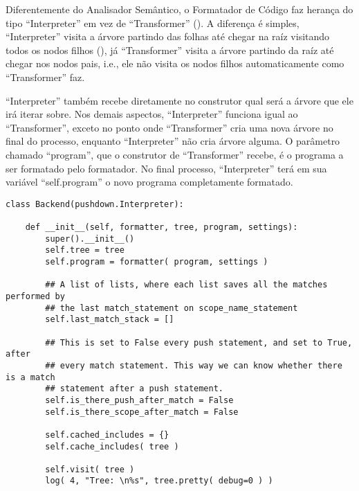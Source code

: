 Diferentemente do Analisador Semântico,
o Formatador de Código faz herança do tipo ``Interpreter'' em vez de ``Transformer'' ().
A diferença é simples,
``Interpreter'' visita a árvore partindo das folhas até chegar na raíz visitando todos os nodos filhos (),
já ``Transformer'' visita a árvore partindo da raíz até chegar nos nodos pais,
i.e.,
ele não visita os nodos filhos automaticamente como ``Transformer'' faz.

``Interpreter'' também recebe diretamente no construtor qual será a árvore que ele irá iterar sobre.
Nos demais aspectos,
``Interpreter'' funciona igual ao ``Transformer'',
exceto no ponto onde ``Transformer'' cria uma nova árvore no final do processo,
enquanto ``Interpreter'' não cria árvore alguma.
O parâmetro chamado ``program'',
que o construtor de ``Transformer'' recebe,
é o programa a ser formatado pelo formatador.
No final processo,
``Interpreter'' terá em sua variável ``self.program'' o novo programa completamente formatado.
\begin{lstlisting}[caption={Construtor do Formatador},label={construtorDoFormatador},style=python_style]
class Backend(pushdown.Interpreter):

    def __init__(self, formatter, tree, program, settings):
        super().__init__()
        self.tree = tree
        self.program = formatter( program, settings )

        ## A list of lists, where each list saves all the matches performed by
        ## the last match_statement on scope_name_statement
        self.last_match_stack = []

        ## This is set to False every push statement, and set to True, after
        ## every match statement. This way we can know whether there is a match
        ## statement after a push statement.
        self.is_there_push_after_match = False
        self.is_there_scope_after_match = False

        self.cached_includes = {}
        self.cache_includes( tree )

        self.visit( tree )
        log( 4, "Tree: \n%s", tree.pretty( debug=0 ) )
\end{lstlisting}

